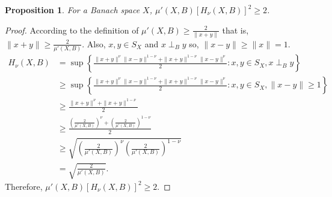 \documentclass[preprint,12pt]{elsarticle}
\newtheorem{proposition}[thm]{Proposition}
\numberwithin{equation}{section}
\begin{document}
\begin{proposition}
For a Banach space $X$, $ \mu'(X,B)[H_{\nu}(X,B)]^2\geq2$.
\end{proposition}
\begin{proof}
According to the definition of $\mu'(X,B)\geq\frac{2}{\|x+y\|}$ that is, $\|x+y\|\geq \frac{2}{\mu'(X,B)}$.
Also, $x,y\in S_X$ and $x\perp_B y$ so, $\|x-y\|\geq \|x\|=1$. 
\begin{align*}
H_{\nu}(X,B)&= \sup\left\{\frac{\|x+y\|^{\nu}\|x-y\|^{1-\nu} + \|x+y\|^{1-\nu}\|x-y\|^{\nu}}{2}: x,y \in S_X, x\perp_B y\right\}\\
 &\geq \sup\left\{\frac{\|x+y\|^{\nu}\|x-y\|^{1-\nu} + \|x+y\|^{1-\nu}\|x-y\|^{\nu}}{2}: x,y \in S_X, \|x-y\|\geq 1 \right\}\\
&\geq \frac{\|x+y\|^{\nu} + \|x+y\|^{1-\nu}}{2}\\
 &\geq \frac{\left( \frac{2}{\mu'(X,B)} \right)^{\nu} + \left( \frac{2}{\mu'(X,B)} \right)^{1-\nu}}{2}\\
 &\geq \sqrt{\left( \frac{2}{\mu'(X,B)} \right)^{\nu}\left( \frac{2}{\mu'(X,B)} \right)^{1-\nu}}\\
 &=\sqrt{\frac{2}{\mu'(X,B)}}.
 \end{align*}
Therefore, $ \mu'(X,B)[H_{\nu}(X,B)]^2\geq2$.
\end{proof}
\end{document}

